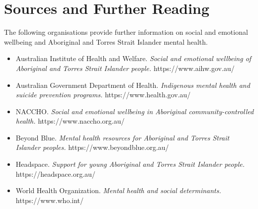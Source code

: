 \section*{Sources and Further Reading}
The following organisations provide further information on social and emotional wellbeing and Aboriginal and Torres Strait Islander mental health.

\begin{itemize}
    \item Australian Institute of Health and Welfare. \textit{Social and emotional wellbeing of Aboriginal and Torres Strait Islander people.} https://www.aihw.gov.au/
    \item Australian Government Department of Health. \textit{Indigenous mental health and suicide prevention programs.} https://www.health.gov.au/
    \item NACCHO. \textit{Social and emotional wellbeing in Aboriginal community-controlled health.} https://www.naccho.org.au/
    \item Beyond Blue. \textit{Mental health resources for Aboriginal and Torres Strait Islander peoples.} https://www.beyondblue.org.au/
    \item Headspace. \textit{Support for young Aboriginal and Torres Strait Islander people.} https://headspace.org.au/
    \item World Health Organization. \textit{Mental health and social determinants.} https://www.who.int/
\end{itemize}
